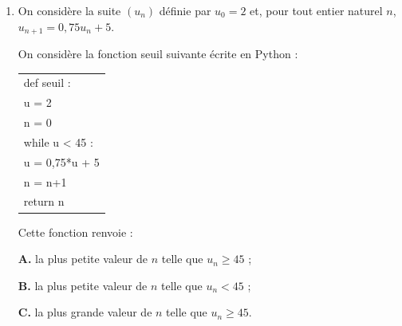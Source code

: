 \documentclass[10pt]{article}
\providecommand{\np}[2][]{{#2~#1}}
\begin{document}
\begin{enumerate}
\textbf{B.} La suite $\left(u_n\right)$ est décroissante.

\textbf{C.} L'un des termes de la suite $\left(u_n\right)$ est égal à \np{2021}.
\item On considère la suite $\left(u_n\right)$ définie par $u_0 = 2$ et, pour tout entier naturel $n$,\,
 $u_{n+1} = 0,75u_n +5$.\\
\begin{minipage}{9cm}
On considère la fonction \og seuil \fg{} suivante écrite en Python :

\begin{center}
\begin{tabular}{|l|}\hline
def seuil {} :\\
\quad u = 2\\
\quad n = 0\\
\quad while u < 45 :\\
\qquad u = 0,75*u + 5\\
\qquad n = n+1\\
\quad return n\\ \hline
\end{tabular}
\end{center}
\end{minipage}
\begin{minipage}{8cm}
Cette fonction renvoie :

\textbf{A.} la plus petite valeur de $n$ telle que $u_n \geqslant  45$ ;
 
\textbf{B.} la plus petite valeur de $n$ telle que $u_n  < 45$ ;
 
\textbf{C.} la plus grande valeur de $n$ telle que $u_n \geqslant 45$.
\end{minipage}
\end{enumerate}


\bigskip
\end{document}
